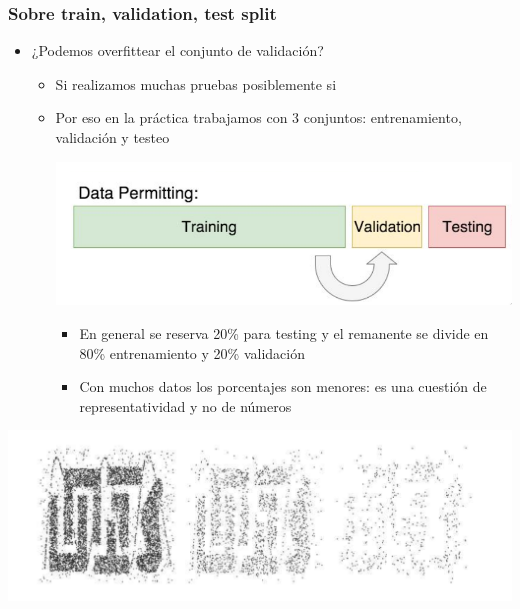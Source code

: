 \documentclass[leqno, 10pt, envcountsect]{beamer}
\numberwithin{equation}{section}
\theoremstyle{definition}
\theoremstyle{example}
\numberwithin{figure}{section}
\numberwithin{table}{section}
\let\olditem\item
\renewcommand{\item}{%
\olditem\vspace{1pt}}
\begin{document}
\begin{frame}[fragile=singleslide]
  \frametitle{Sobre train, validation, test split}
  \begin{itemize}
    \item ¿Podemos overfittear el conjunto de validación?
      \begin{itemize}
        \item Si realizamos muchas pruebas posiblemente si
        \item Por eso en la práctica trabajamos con 3 conjuntos:
          entrenamiento, validación y testeo
        \begin{center}
          \includegraphics[scale=0.3]{tvt.png}
        \end{center}
        \begin{itemize}
          \item En general se reserva 20\% para testing y el remanente se
            divide en 80\% entrenamiento y 20\% validación
          \item Con muchos datos los porcentajes son menores: es una cuestión
            de representatividad y no de números
          \nocite{james13}\nocite{efron16}
        \end{itemize}
      \end{itemize}
  \end{itemize}
  \begin{center}
    \includegraphics[scale=0.32]{sample_size.png}
  \end{center}
\end{frame}
\end{document}
